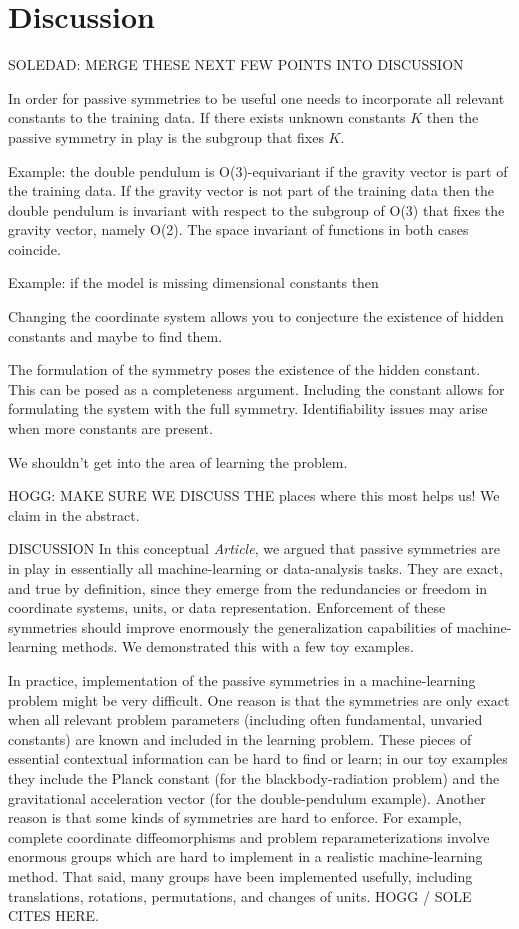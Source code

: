 \documentclass{article}
\theoremstyle{plain}
\theoremstyle{definition}
\theoremstyle{remark}
\newcommand{\documentname}{\textsl{Article}}
\begin{document}
\section{Discussion}\label{sec:discussion}

SOLEDAD: MERGE THESE NEXT FEW POINTS INTO DISCUSSION

In order for passive symmetries to be useful one needs to incorporate all relevant constants to the training data. If there exists unknown constants $K$ then the passive symmetry in play is the subgroup that fixes $K$.

Example: the double pendulum is O(3)-equivariant if the gravity vector is part of the training data. If the gravity vector is not part of the training data then the double pendulum is invariant with respect to the subgroup of O(3) that fixes the gravity vector, namely O(2). The space invariant of functions in both cases coincide.

Example: if the model is missing dimensional constants then 

   Changing the coordinate system allows you to conjecture the existence of hidden constants and maybe to find them. 
   
   The formulation of the symmetry poses the existence of the hidden constant. This can be posed as a completeness argument. Including the constant allows for formulating the system with the full symmetry.
   Identifiability issues may arise when more constants are present.
   
   We shouldn't get into the area of learning the problem. 

HOGG: MAKE SURE WE DISCUSS THE places where this most helps us! We claim in the abstract.


DISCUSSION
In this conceptual \documentname,
we argued that passive symmetries are in play in essentially all machine-learning or data-analysis tasks.
They are exact, and true by definition, since they emerge from the redundancies or freedom in coordinate systems, units, or data representation.
Enforcement of these symmetries should improve enormously the generalization capabilities of machine-learning methods.
We demonstrated this with a few toy examples.

In practice, implementation of the passive symmetries in a machine-learning problem might be very difficult.
One reason is that the symmetries are only exact when all relevant problem parameters (including often fundamental, unvaried constants) are known and included in the learning problem.
These pieces of essential contextual information can be hard to find or learn; in our toy examples they include the Planck constant (for the blackbody-radiation problem) and the gravitational acceleration vector (for the double-pendulum example).
Another reason is that some kinds of symmetries are hard to enforce.
For example, complete coordinate diffeomorphisms and problem reparameterizations involve enormous groups which are hard to implement in a realistic machine-learning method.
That said, many groups have been implemented usefully, including translations, rotations, permutations, and changes of units. HOGG / SOLE CITES HERE.
\end{document}
